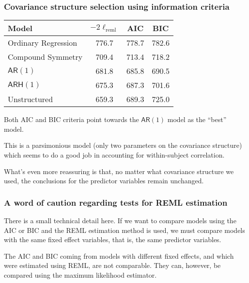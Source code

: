 \documentclass{beamer}
\begin{document}
\begin{frame}[fragile]
\frametitle{Covariance structure selection using information criteria}
\begin{center}
\begin{footnotesize}
\begin{tabular}{l c c c}
\toprule 
\textbf{Model} & $-2\ell_{\textrm{reml}}$ & \textbf{AIC} & \textbf{BIC} \\ \midrule
Ordinary Regression & 776.7 & 778.7 & 782.6 \\ 
Compound Symmetry & 709.4 & 713.4 & 718.2 \\ 
$\mathsf{AR}(1)$ & 681.8 & \alert{685.8} & \alert{690.5} \\ 
$\mathsf{ARH}(1)$ & 675.3 & 687.3 & 701.6 \\ 
Unstructured & 659.3 & 689.3 & 725.0 \\ \bottomrule
\end{tabular}
\end{footnotesize}
\end{center}
\bi
\item  Both AIC and BIC criteria point towards the $\mathsf{AR}(1)$ model as the ``best'' model. 
\item This is a parsimonious model (only two parameters on the covariance structure) which seems to do a good job in accounting for within-subject correlation.
\item What's even more reassuring is that, no matter what covariance structure we used, the conclusions for the predictor variables remain unchanged.
\ei
\end{frame}

\begin{frame}
\frametitle{A word of caution  regarding tests for REML estimation}
\bi
\item There is a small technical detail here. If we want to compare models using the AIC or BIC and the REML estimation method is used, we must compare models with the  \alert{same fixed effect variables}, that is, the same predictor variables. 
\item The AIC and BIC coming from models with different fixed effects, and which were estimated using REML, are not comparable. They can, however, be compared using the maximum likelihood estimator.

\ei
\end{frame}

% 
\end{document}
